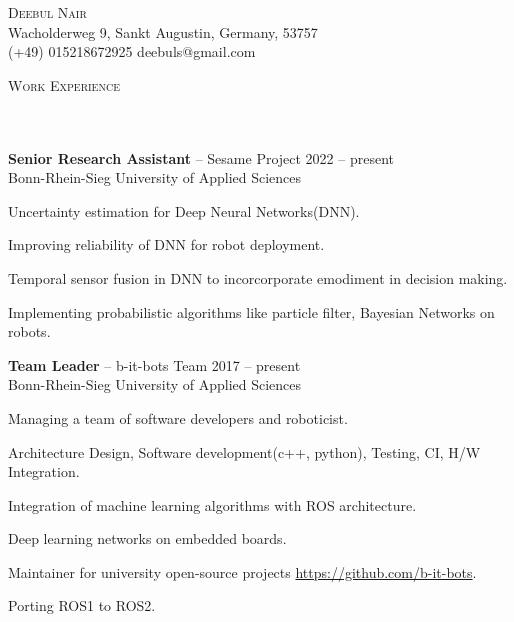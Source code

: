 \documentclass{article}
\newcommand{\contact}[3]{
\vspace*{5pt}
\begin{center}
{\Huge \scshape {#1}}\\
\vspace{3pt}
#2 
\vspace{2pt}
#3
\end{center}
\vspace*{-8pt}
}
\newcommand{\header}[1]{{
\hspace*{-15pt}\vspace*{6pt} \textsc{#1}} \vspace*{-6pt} 
\lineunder
}
\newcommand{\lineunder}{
\vspace*{-8pt} \\ \hspace*{-18pt} 
\hrulefill \\
}
\newcommand{\content}{
\vspace*{2pt}%
}
\newcommand{\employer}[4]{{
\vspace*{2pt}%
\textbf{#1} #2 \hfill #3\\ #4 \vspace*{2pt}}
}
\renewcommand{\labelitemi}{
	\raisebox{0.3ex}{\tiny\textbullet}
}
\renewcommand{\labelitemii}{
	\raisebox{0.3ex}{\tiny\textbullet}
}
\newenvironment{bullet-list-minor}{
\begin{list}{\labelitemii}{\setlength\leftmargin{15pt} 
\topsep 0pt \itemsep -2pt}}{\vspace*{4pt}\end{list}
}
\begin{document}
\small
\smallskip
\vspace*{-44pt}

\contact{Deebul Nair}
{Wacholderweg 9, Sankt Augustin, Germany, 53757\\}
{(+49) 015218672925 \labelitemi deebuls@gmail.com}
\vspace{15pt}

\vspace*{4pt}%


\vspace*{4pt}%
\header{Work Experience}
    \employer{Senior Research Assistant}{-- Sesame Project}{2022 -- present}
    {Bonn-Rhein-Sieg University of Applied Sciences}
	\begin{bullet-list-minor}
	\item Uncertainty estimation for Deep Neural Networks(DNN).
    \item Improving reliability of DNN for robot deployment.
    \item  Temporal sensor fusion in DNN to incorcorporate emodiment in decision making.
    \item Implementing probabilistic algorithms like particle filter, Bayesian Networks on robots.
    \end{bullet-list-minor}
    
    \employer{Team Leader}{-- b-it-bots Team}{2017 -- present}
    {Bonn-Rhein-Sieg University of Applied Sciences}
	\begin{bullet-list-minor}
	\item Managing a team of software developers and roboticist.
	\item Architecture Design, Software development(c++, python), Testing, CI, H/W Integration.
	\item Integration of machine learning algorithms with ROS architecture.
    \item Deep learning networks on embedded boards.
    \item Maintainer for university open-source projects \url{https://github.com/b-it-bots}.
	\item Porting ROS1 to ROS2.
    \end{bullet-list-minor}
    
\end{document}
